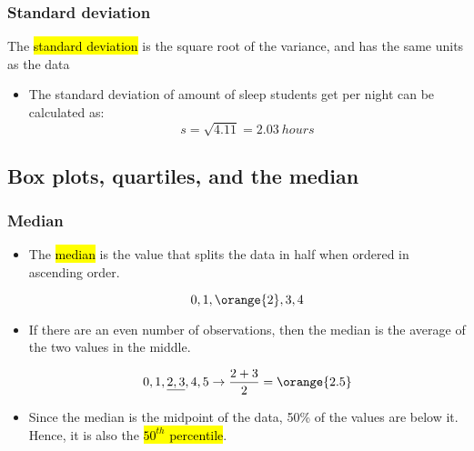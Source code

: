 \documentclass[slidestop,compress,mathserif]{beamer}
\begin{document}
\begin{frame}
\frametitle{Standard deviation}

The \hl{standard deviation} is the square root of the variance, and has the same units as the data

\formula{
\[ s = \sqrt{s^2} \]
}

\pause

{
\begin{itemize}

\item The standard deviation of amount of sleep students get per night can be calculated as:
\[ s = \sqrt{4.11} = 2.03~hours\]

\end{itemize}
}
{
}

\end{frame}


\subsection{Box plots, quartiles, and the median}


\begin{frame}
\frametitle{Median}

\begin{itemize}

\item The \hl{median} is the value that splits the data in half when ordered in ascending order.

\[ 0,1,\orange{2},3,4 \]

\item If there are an even number of observations, then the median is the average of the two values in the middle.

\[ 0,1,\underline{2,3},4,5 \rightarrow \frac{2 + 3}{2} = \orange{2.5} \]

\item Since the median is the midpoint of the data, 50\% of the values are below it. Hence, it is also the \hl{$50^{th}$ percentile}.

\end{itemize}

\end{frame}
\end{document}
